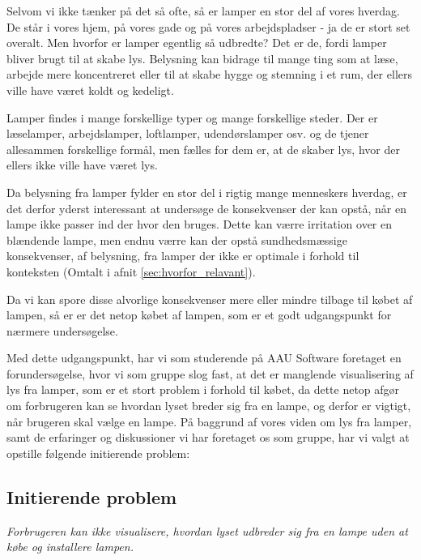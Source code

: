 Selvom vi ikke tænker på det så ofte, så er lamper en stor del af vores hverdag. De står i vores hjem, på vores gade og på vores arbejdspladser - ja de er stort set overalt. Men hvorfor er lamper egentlig så udbredte? Det er de, fordi lamper bliver brugt til at skabe lys. Belysning kan bidrage til mange ting som at læse, arbejde mere koncentreret eller til at skabe hygge og stemning i et rum, der ellers ville have været koldt og kedeligt. 

Lamper findes i mange forskellige typer og mange forskellige steder. Der er læselamper, arbejdslamper, loftlamper, udendørslamper osv. og de tjener allesammen forskellige formål, men fælles for dem er, at de skaber lys, hvor der ellers ikke ville have været lys. 

Da belysning fra lamper fylder en stor del i rigtig mange menneskers hverdag, er det derfor yderst interessant at undersøge de konsekvenser der kan opstå, når en lampe ikke passer ind der hvor den bruges. Dette kan værre irritation over en blændende lampe, men endnu værre kan der opstå sundhedsmæssige konsekvenser, af belysning, fra lamper der ikke er optimale i forhold til konteksten (Omtalt i afnit \ref{sec:hvorfor_relavant}).

Da vi kan spore disse alvorlige konsekvenser mere eller mindre tilbage til købet af lampen, så er er det netop købet af lampen, som er et godt udgangspunkt for nærmere undersøgelse.

Med dette udgangspunkt, har vi som studerende på AAU Software foretaget en forundersøgelse, hvor vi som gruppe slog fast, at det er manglende visualisering af lys fra lamper, som er et stort problem i forhold til købet, da dette netop afgør om forbrugeren kan se hvordan lyset breder sig fra en lampe, og derfor er vigtigt, når brugeren skal vælge en lampe. På baggrund af vores viden om lys fra lamper, samt de erfaringer og diskussioner vi har foretaget os som gruppe, har vi valgt at opstille følgende initierende problem:

\subsection{Initierende problem}
\textit{Forbrugeren kan ikke visualisere, hvordan lyset udbreder sig fra en lampe uden at købe og installere lampen.}